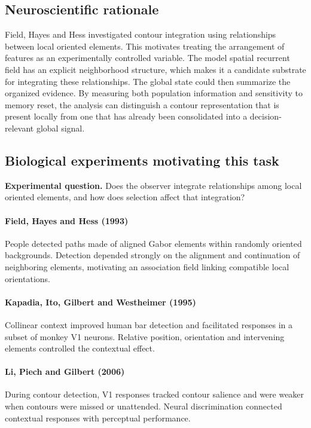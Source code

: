 \documentclass[11pt]{article}
\begin{document}
\subsection{Neuroscientific rationale}
Field, Hayes and Hess investigated contour integration using relationships between local oriented elements. This motivates treating the arrangement of features as an experimentally controlled variable. The model spatial recurrent field has an explicit neighborhood structure, which makes it a candidate substrate for integrating these relationships. The global state could then summarize the organized evidence. By measuring both population information and sensitivity to memory reset, the analysis can distinguish a contour representation that is present locally from one that has already been consolidated into a decision-relevant global signal.

\subsection{Biological experiments motivating this task}
\textbf{Experimental question.} Does the observer integrate relationships among local oriented elements, and how does selection affect that integration?

\paragraph{Field, Hayes and Hess (1993)} People detected paths made of aligned Gabor elements within randomly oriented backgrounds. Detection depended strongly on the alignment and continuation of neighboring elements, motivating an association field linking compatible local orientations. \cite{bio_field}

\paragraph{Kapadia, Ito, Gilbert and Westheimer (1995)} Collinear context improved human bar detection and facilitated responses in a subset of monkey V1 neurons. Relative position, orientation and intervening elements controlled the contextual effect. \cite{bio_kapadia}

\paragraph{Li, Piech and Gilbert (2006)} During contour detection, V1 responses tracked contour salience and were weaker when contours were missed or unattended. Neural discrimination connected contextual responses with perceptual performance. \cite{bio_li}
\end{document}
